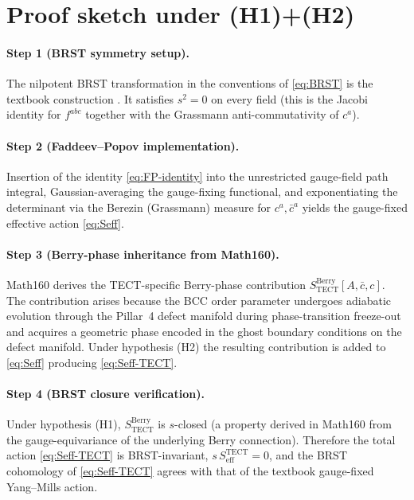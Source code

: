 \section{Proof sketch under (H1)+(H2)}\label{sec:proof}

\paragraph{Step 1 (BRST symmetry setup).}
The nilpotent BRST transformation in the conventions of
\eqref{eq:BRST} is the textbook construction
\cite{BRST1976,Tyutin1975}. It satisfies $s^2 = 0$ on every field
(this is the Jacobi identity for $f^{abc}$ together with the
Grassmann anti-commutativity of $c^{a}$).

\paragraph{Step 2 (Faddeev--Popov implementation).}
Insertion of the identity \eqref{eq:FP-identity} into the
unrestricted gauge-field path integral, Gaussian-averaging the
gauge-fixing functional, and exponentiating the determinant via the
Berezin (Grassmann) measure for $c^{a},\bar c^{a}$ yields the
gauge-fixed effective action \eqref{eq:Seff}.

\paragraph{Step 3 (Berry-phase inheritance from Math160).}
Math160 derives the TECT-specific Berry-phase contribution
$S^{\mathrm{Berry}}_{\mathrm{TECT}}[A,\bar c, c]$. The contribution
arises because the BCC order parameter undergoes adiabatic evolution
through the Pillar~4 defect manifold during phase-transition
freeze-out and acquires a geometric phase encoded in the ghost
boundary conditions on the defect manifold. Under hypothesis (H2)
the resulting contribution is added to \eqref{eq:Seff} producing
\eqref{eq:Seff-TECT}.

\paragraph{Step 4 (BRST closure verification).}
Under hypothesis (H1), $S^{\mathrm{Berry}}_{\mathrm{TECT}}$ is
$s$-closed (a property derived in Math160 from the gauge-equivariance
of the underlying Berry connection). Therefore the total action
\eqref{eq:Seff-TECT} is BRST-invariant, $s\,S^{\mathrm{TECT}}_{\mathrm{eff}}=0$,
and the BRST cohomology of \eqref{eq:Seff-TECT} agrees with that of
the textbook gauge-fixed Yang--Mills action.

